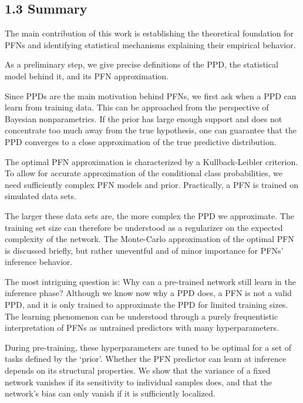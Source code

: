 \documentclass[aspectratio=169,10pt]{beamer}
\newcommand{\currentheading}{\ifx\insertsubsection\empty\insertsection\else\insertsubsection\fi}
\begin{document}
\subsection{1.3 Summary}

\begin{frame}{\currentheading}
The main contribution of this work is establishing the theoretical foundation for PFNs and identifying statistical mechanisms explaining their empirical behavior.
\end{frame}

\begin{frame}{\currentheading}
As a preliminary step, we give precise definitions of the PPD, the statistical model behind it, and its PFN approximation.
\end{frame}

\begin{frame}{\currentheading}
Since PPDs are the main motivation behind PFNs, we first ask when a PPD can learn from training data. This can be approached from the perspective of Bayesian nonparametrics. If the prior has large enough support and does not concentrate too much away from the true hypothesis, one can guarantee that the PPD converges to a close approximation of the true predictive distribution.
\end{frame}

\begin{frame}{\currentheading}
The optimal PFN approximation is characterized by a Kullback-Leibler criterion. To allow for accurate approximation of the conditional class probabilities, we need sufficiently complex PFN models and prior. Practically, a PFN is trained on simulated data sets.

The larger these data sets are, the more complex the PPD we approximate. The training set size can therefore be understood as a regularizer on the expected complexity of the network. The Monte-Carlo approximation of the optimal PFN is discussed briefly, but rather uneventful and of minor importance for PFNs' inference behavior.
\end{frame}

\begin{frame}{\currentheading}
The most intriguing question is: Why can a pre-trained network still learn in the inference phase? Although we know now why a PPD does, a PFN is not a valid PPD, and it is only trained to approximate the PPD for limited training sizes. The learning phenomenon can be understood through a purely frequentistic interpretation of PFNs as untrained predictors with many hyperparameters.

During pre-training, these hyperparameters are tuned to be optimal for a set of tasks defined by the `prior'. Whether the PFN predictor can learn at inference depends on its structural properties. We show that the variance of a fixed network vanishes if its sensitivity to individual samples does, and that the network's bias can only vanish if it is sufficiently localized.
\end{frame}
\end{document}
